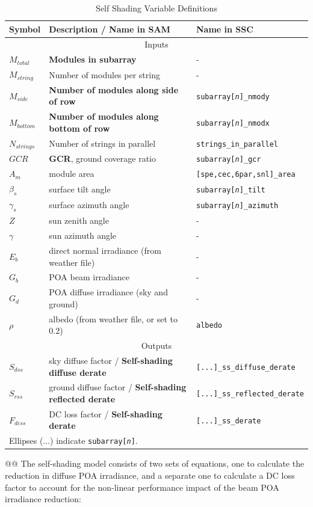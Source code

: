 \documentclass[12pt,letterpaper]{article}
\newcommand\GCR{\ensuremath{\mathit{GCR}}}
\begin{document}
\begin{table}
\begin{center}
\caption{Self Shading Variable Definitions}
\begin{tabular}{lll}
\midrule
Symbol & Description / \textbf{Name in SAM} & Name in SSC\\
\midrule
\multicolumn{3}{c}{Inputs}\\
$M_{total}$ & \textbf{Modules in subarray} & -\\
$M_{string}$ & Number of modules per string & -\\
$M_{side}$ & \textbf{Number of modules along side of row} & \texttt{subarray[\textit{n}]\_nmody}\\
$M_{bottom}$ & \textbf{Number of modules along bottom of row} & \texttt{subarray[\textit{n}]\_nmodx}\\
$N_{strings}$ & Number of strings in parallel & \texttt{strings\_in\_parallel}\\
$\GCR$ & \textbf{GCR}, ground coverage ratio & \texttt{subarray[\textit{n}]\_gcr}\\
$A_m$ & module area & \texttt{[spe,cec,6par,snl]\_area}\\
$\beta_s$ & surface tilt angle & \texttt{subarray[\textit{n}]\_tilt} \\
$\gamma_s$ & surface azimuth angle & \texttt{subarray[\textit{n}]\_azimuth} \\
$Z$ & sun zenith angle & -\\
$\gamma$ & sun azimuth angle & - \\
$E_b$ & direct normal irradiance (from weather file) & - \\
$G_b$ & POA beam irradiance & - \\
$G_d$ & POA diffuse irradiance (sky and ground) & - \\
$\rho$ & albedo (from weather file, or set to 0.2) & \texttt{albedo} \\
\midrule
\multicolumn{3}{c}{Outputs}\\
$S_{dss}$ & sky diffuse factor  / \textbf{Self-shading diffuse derate}& \texttt{[...]\_ss\_diffuse\_derate}\\
$S_{rss}$ & ground diffuse factor  / \textbf{Self-shading reflected derate}& \texttt{[...]\_ss\_reflected\_derate}\\
$F_{dcss}$& DC loss factor / \textbf{Self-shading derate} & \texttt{[...]\_ss\_derate}\\
\midrule
\multicolumn{3}{l}{Ellipses (...) indicate \texttt{subarray[\textit{n}]}.}\\
\end{tabular}
\label{tab-selfshadinputs}
\end{center}
\end{table}
@@
The self-shading model consists of two sets of equations, one to calculate the reduction in diffuse POA irradiance, and a separate one to calculate a DC loss factor to account for the non-linear performance impact of the beam POA irradiance reduction:
\end{document}
